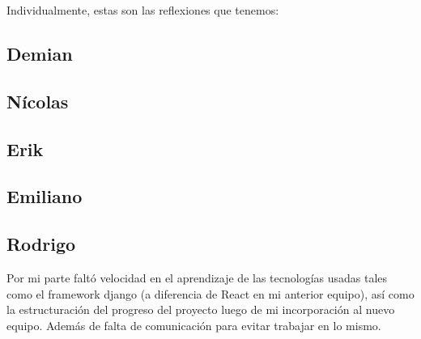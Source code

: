 \documentclass[12pt]{article}
\newcounter{ni}
\begin{document}
\vspace{1cm}
Individualmente, estas son las reflexiones que tenemos:

\subsection{Demian}
\subsection{Nícolas}
\subsection{Erik}
\subsection{Emiliano}
\subsection{Rodrigo}
Por mi parte faltó velocidad en el aprendizaje de las tecnologías usadas tales como el framework django (a diferencia de React en mi anterior equipo),
así como la estructuración del progreso del proyecto luego de mi incorporación al nuevo equipo. Además de falta de comunicación para evitar trabajar en lo mismo.
\end{document}
